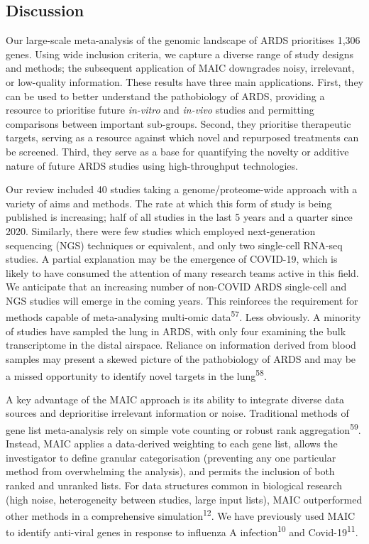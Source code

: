 \documentclass[
  11,
  a4paper,
]{article}
\begin{document}
\newpage

\subsection{Discussion}\label{discussion}

Our large-scale meta-analysis of the genomic landscape of ARDS
prioritises 1,306 genes. Using wide inclusion criteria, we capture a
diverse range of study designs and methods; the subsequent application
of MAIC downgrades noisy, irrelevant, or low-quality information. These
results have three main applications. First, they can be used to better
understand the pathobiology of ARDS, providing a resource to prioritise
future \emph{in-vitro} and \emph{in-vivo} studies and permitting
comparisons between important sub-groups. Second, they prioritise
therapeutic targets, serving as a resource against which novel and
repurposed treatments can be screened. Third, they serve as a base for
quantifying the novelty or additive nature of future ARDS studies using
high-throughput technologies.

Our review included 40 studies taking a genome/proteome-wide approach
with a variety of aims and methods. The rate at which this form of study
is being published is increasing; half of all studies in the last 5
years and a quarter since 2020. Similarly, there were few studies which
employed next-generation sequencing (NGS) techniques or equivalent, and
only two single-cell RNA-seq studies. A partial explanation may be the
emergence of COVID-19, which is likely to have consumed the attention of
many research teams active in this field. We anticipate that an
increasing number of non-COVID ARDS single-cell and NGS studies will
emerge in the coming years. This reinforces the requirement for methods
capable of meta-analysing multi-omic data\textsuperscript{57}. Less
obviously. A minority of studies have sampled the lung in ARDS, with
only four examining the bulk transcriptome in the distal airspace.
Reliance on information derived from blood samples may present a skewed
picture of the pathobiology of ARDS and may be a missed opportunity to
identify novel targets in the lung\textsuperscript{58}.

A key advantage of the MAIC approach is its ability to integrate diverse
data sources and deprioritise irrelevant information or noise.
Traditional methods of gene list meta-analysis rely on simple vote
counting or robust rank aggregation\textsuperscript{59}. Instead, MAIC
applies a data-derived weighting to each gene list, allows the
investigator to define granular categorisation (preventing any one
particular method from overwhelming the analysis), and permits the
inclusion of both ranked and unranked lists. For data structures common
in biological research (high noise, heterogeneity between studies, large
input lists), MAIC outperformed other methods in a comprehensive
simulation\textsuperscript{12}. We have previously used MAIC to identify
anti-viral genes in response to influenza A
infection\textsuperscript{10} and Covid-19\textsuperscript{11}.
\end{document}
